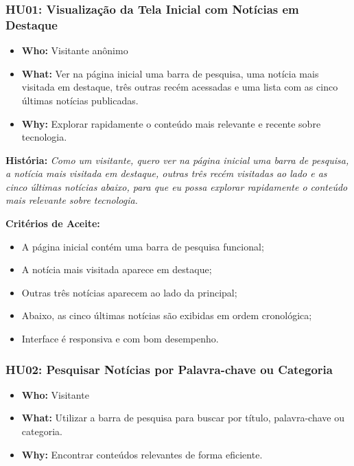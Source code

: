 \subsubsection*{HU01: Visualização da Tela Inicial com Notícias em Destaque}

\begin{itemize}
  \item \textbf{Who:} Visitante anônimo
  \item \textbf{What:} Ver na página inicial uma barra de pesquisa, uma notícia mais visitada em destaque, três outras recém acessadas e uma lista com as cinco últimas notícias publicadas.
  \item \textbf{Why:} Explorar rapidamente o conteúdo mais relevante e recente sobre tecnologia.
\end{itemize}

\noindent \textbf{História:} \textit{Como um visitante, quero ver na página inicial uma barra de pesquisa, a notícia mais visitada em destaque, outras três recém visitadas ao lado e as cinco últimas notícias abaixo, para que eu possa explorar rapidamente o conteúdo mais relevante sobre tecnologia.}

\noindent \textbf{Critérios de Aceite:}
\begin{itemize}
  \item A página inicial contém uma barra de pesquisa funcional;
  \item A notícia mais visitada aparece em destaque;
  \item Outras três notícias aparecem ao lado da principal;
  \item Abaixo, as cinco últimas notícias são exibidas em ordem cronológica;
  \item Interface é responsiva e com bom desempenho.
\end{itemize}

\subsubsection*{HU02: Pesquisar Notícias por Palavra-chave ou Categoria}

\begin{itemize}
  \item \textbf{Who:} Visitante
  \item \textbf{What:} Utilizar a barra de pesquisa para buscar por título, palavra-chave ou categoria.
  \item \textbf{Why:} Encontrar conteúdos relevantes de forma eficiente.
\end{itemize}

